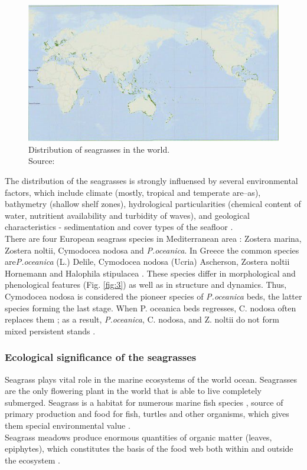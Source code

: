 \documentclass[10pt, a4paper]{article}
\begin{document}
\begin{figure}
	\centering
	\includegraphics[scale=0.25]{Fig-1-2.jpg}
	\caption{Distribution of seagrasses in the world.\\ Source:\cite{Green03}\label{Green03} 
	\label{fig:2}} 
\end{figure}

The distribution of the seagrasses is strongly influensed by several environmental factors, which
include climate (mostly, tropical and temperate are--as), bathymetry (shallow shelf zones), hydrological
particularities (chemical content of water, nutritient availability and turbidity of waves), and geological 
characteristics - sedimentation and cover types of the seafloor \cite{McKenzie06}\label{McKenzie06}.\\
There are four European seagrass species in Mediterranean area \cite{Borum04}\label{Borum04}: Zostera marina,
Zostera noltii, Cymodocea nodosa and \textit{P.oceanica}. In Greece the common species are\textit{P.oceanica}
(L.) Delile, Cymodocea nodosa (Ucria) Ascherson, Zostera noltii Hornemann and Halophila
stipulacea \cite{Amoutzopoulou-Schina05}\label{Amoutzopoulou-Schina05}. 
These species differ in morphological and
phenological features (Fig. \ref{fig:3}) as well as in structure and dynamics. Thus, Cymodocea nodosa is
considered the pioneer species of \textit{P.oceanica} beds, the latter species forming the last stage. When P.
oceanica beds regresses, C. nodosa often replaces them \cite{DenHartog77}\label{DenHartog77}; as a result, \textit{P.oceanica},
C. nodosa, and Z. noltii do not form mixed persistent stands \cite{Buia91}\label{Buia91}.

\subsubsection{Ecological significance of the seagrasses}
Seagrass plays vital role in the marine ecosystems of the world ocean. Seagrasses are the only
flowering plant in the world that is able to live completely submerged. Seagrass is a habitat for
numerous marine fish species \cite{Nagelkerken00}\label{Nagelkerken00}, source of primary production and food for
fish, turtles and other organisms, which gives them special environmental value \cite{Noralez10}\label{Noralez10}.\\
Seagrass meadows produce enormous quantities of organic matter (leaves, epiphytes), which
constitutes the basis of the food web both within and outside the ecosystem \cite{Gobert06}\label{Gobert06}.
\end{document}
